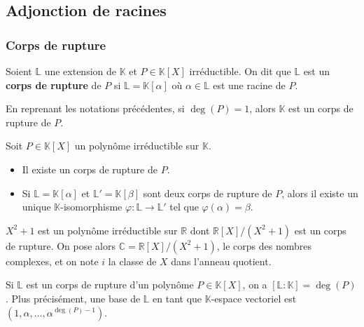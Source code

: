   \subsection{Adjonction de racines}

  \subsubsection{Corps de rupture}


  \begin{definition}
    Soient $\mathbb{L}$ une extension de $\mathbb{K}$ et $P \in \mathbb{K}[X]$ irréductible. On dit que $\mathbb{L}$ est un \textbf{corps de rupture} de $P$ si $\mathbb{L} = \mathbb{K}[\alpha]$ où $\alpha \in \mathbb{L}$ est une racine de $P$.
  \end{definition}

  \begin{example}
    En reprenant les notations précédentes, si $\deg(P) = 1$, alors $\mathbb{K}$ est un corps de rupture de $P$.
  \end{example}

  \begin{theorem}
    Soit $P \in \mathbb{K}[X]$ un polynôme irréductible sur $\mathbb{K}$.
    \begin{itemize}
      \item Il existe un corps de rupture de $P$.
      \item Si $\mathbb{L} = \mathbb{K}[\alpha]$ et $\mathbb{L}' = \mathbb{K}[\beta]$ sont deux corps de rupture de $P$, alors il existe un unique $\mathbb{K}$-isomorphisme $\varphi : \mathbb{L} \rightarrow \mathbb{L}'$ tel que $\varphi(\alpha) = \beta$.
    \end{itemize}
  \end{theorem}

  \begin{application}
    $X^2 + 1$ est un polynôme irréductible sur $\mathbb{R}$ dont $\mathbb{R}[X]/(X^2+1)$ est un corps de rupture. On pose alors $\mathbb{C} = \mathbb{R}[X]/(X^2+1)$, le corps des nombres complexes, et on note $i$ la classe de $X$ dans l'anneau quotient.
  \end{application}

  \begin{remark}
    Si $\mathbb{L}$ est un corps de rupture d'un polynôme $P \in \mathbb{K}[X]$, on a $[\mathbb{L}:\mathbb{K}] = \deg(P)$. Plus précisément, une base de $\mathbb{L}$ en tant que $\mathbb{K}$-espace vectoriel est $(1, \alpha, \dots, \alpha^{\deg(P)-1})$.
  \end{remark}

